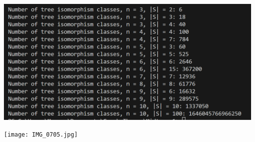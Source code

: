 \documentclass[11pt,reqno]{amsart}
\theoremstyle{definition}
\begin{document}
\includegraphics*{Results.png}

\newpage




\texttt{[image: IMG\_0705.jpg]}
\end{document}
